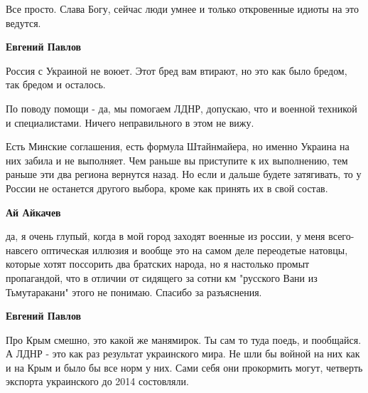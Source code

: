 \begin{itemize}
\begin{itemize}
Все просто. Слава Богу, сейчас люди умнее и только откровенные идиоты на это
ведутся.

 
\textbf{Евгений Павлов} 

Россия с Украиной не воюет. Этот бред вам втирают, но это как было бредом, так
бредом и осталось. 

По поводу помощи - да, мы помогаем ЛДНР, допускаю, что и военной техникой и
специалистами. Ничего неправильного в этом не вижу. 

Есть Минские соглашения, есть формула Штайнмайера, но именно Украина на них
забила и не выполняет. Чем раньше вы приступите к их выполнению, тем раньше эти
два региона вернутся назад. Но если и дальше будете затягивать, то у России не
останется другого выбора, кроме как принять их в свой состав.

 
\textbf{Ай Айкачев} 

да, я очень глупый, когда в мой город заходят военные из россии, у меня
всего-навсего оптическая иллюзия и вообще это на самом деле переодетые натовцы,
которые хотят поссорить два братских народа, но я настолько промыт пропагандой,
что в отличии от сидящего за сотни км "русского Вани из Тьмутаракани" этого не
понимаю. Спасибо за разъяснения.


 
\textbf{Евгений Павлов} 

Про Крым смешно, это какой же манямирок. Ты сам то туда поедь, и пообщайся. А
ЛДНР - это как раз результат украинского мира. Не шли бы войной на них как и на
Крым и было бы все норм у них. Сами себя они прокормить могут, четверть
экспорта украинского до 2014 состовляли.

 

\end{itemize}
\end{itemize}
